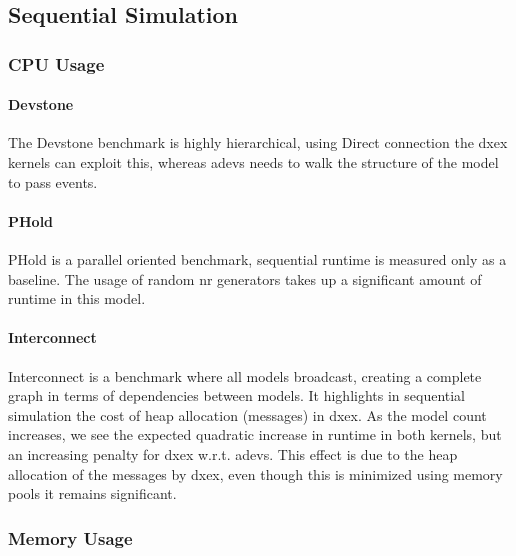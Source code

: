 \subsection{Sequential Simulation}
\subsubsection{CPU Usage}
\paragraph*{Devstone}
The Devstone \cite{DEVStone} benchmark is highly hierarchical, using Direct connection the dxex kernels can exploit this, whereas adevs needs to walk the structure of the model to pass events.
\paragraph*{PHold}
PHold \cite{PHOLD} is a parallel oriented benchmark, sequential runtime is measured only as a baseline. The usage of random nr generators takes up a significant amount of runtime in this model.
\paragraph*{Interconnect}
Interconnect \cite{van2013research} is a benchmark where all models broadcast, creating a complete graph in terms of dependencies between models. It highlights in sequential simulation the cost of heap allocation (messages) in dxex. As the model count increases, we see the expected quadratic increase in runtime in both kernels, but an increasing penalty for dxex w.r.t. adevs. This effect is due to the heap allocation of the messages by dxex, even though this is minimized using memory pools it remains significant.
\subsubsection{Memory Usage}
